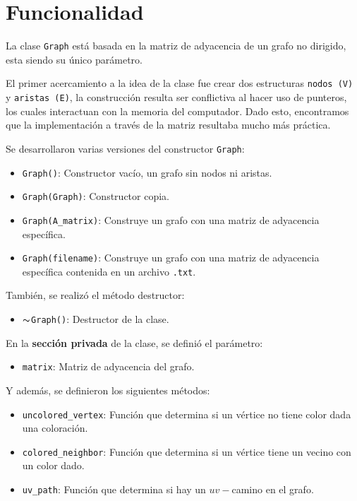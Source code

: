 \documentclass[conference]{IEEEtran}
\begin{document}
\section{Funcionalidad}

La clase \texttt{Graph} está basada en la matriz de adyacencia de un grafo no dirigido, esta siendo su único parámetro. 

El primer acercamiento a la idea de la clase fue crear dos estructuras \texttt{nodos (V)} y \texttt{aristas (E)}, la construcción resulta ser conflictiva al hacer uso de punteros, los cuales interactuan con la memoria del computador. Dado esto, encontramos que la implementación a través de la matriz resultaba mucho más práctica.

Se desarrollaron varias versiones del constructor \texttt{Graph}:
\begin{itemize}
	\item \texttt{Graph()}: Constructor vacío, un grafo sin nodos ni aristas.
	
	\item \texttt{Graph(Graph)}: Constructor copia.
	
	\item \texttt{Graph(A\_matrix)}: Construye un grafo con una matriz de adyacencia específica.
	
	\item \texttt{Graph(filename)}: Construye un grafo con una matriz de adyacencia específica contenida en un archivo \texttt{.txt}.
\end{itemize}  

También, se realizó el método destructor:

\begin{itemize}
	\item \texttt{$\thicksim$Graph()}: Destructor de la clase.
\end{itemize} 

En la \textbf{sección privada} de la clase, se definió el parámetro:
\begin{itemize}
	\item \texttt{matrix}: Matriz de adyacencia del grafo.
	
\end{itemize}

Y además, se definieron los siguientes métodos: 
\begin{itemize}
	
	\item \texttt{uncolored\_vertex}: Función que determina si un vértice no tiene color dada una coloración.

	\item \texttt{colored\_neighbor}: Función que determina si un vértice tiene un vecino con un color dado.
	
	\item \texttt{uv\_path}: Función que determina si hay un $uv-$camino en el grafo.
\end{itemize}
\end{document}
